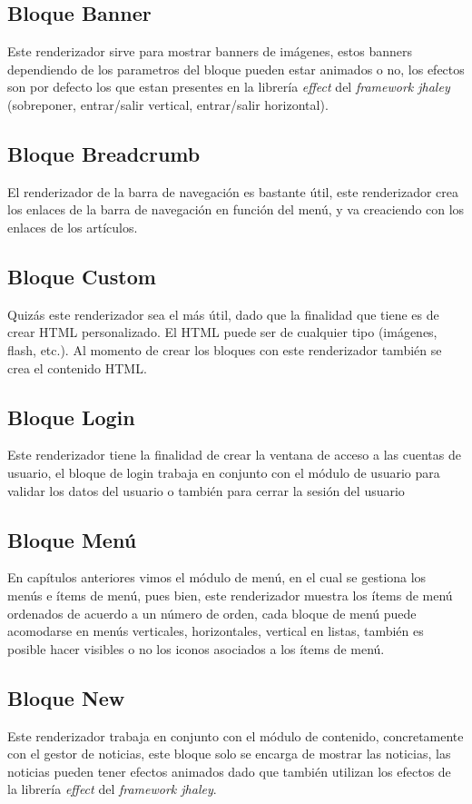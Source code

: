 \subsection{Bloque Banner}
Este renderizador sirve para mostrar banners de im\'agenes, estos banners dependiendo de los parametros del bloque pueden estar animados o no, los efectos son por defecto los que estan presentes en la librer\'ia \textit{effect} del \textit{framework jhaley} (sobreponer, entrar/salir vertical, entrar/salir horizontal).

\subsection{Bloque Breadcrumb}
El renderizador de la barra de navegaci\'on es bastante \'util, este renderizador crea los enlaces de la barra de navegaci\'on en funci\'on del men\'u, y va creaciendo con los enlaces de los art\'iculos.

\subsection{Bloque Custom}
Quiz\'as este renderizador sea el m\'as \'util, dado que la finalidad que tiene es de crear HTML personalizado. El HTML puede ser de cualquier tipo (im\'agenes, flash, etc.). Al momento de crear los bloques con este renderizador tambi\'en se crea el contenido HTML.

\subsection{Bloque Login}
Este renderizador tiene la finalidad de crear la ventana de acceso a las cuentas de usuario, el bloque de login trabaja en conjunto con el m\'odulo de usuario para validar los datos del usuario o tambi\'en para cerrar la sesi\'on del usuario

\subsection{Bloque Men\'u}
En cap\'itulos anteriores vimos el m\'odulo de men\'u, en el cual se gestiona los men\'us e \'items de men\'u, pues bien, este renderizador muestra los \'items de men\'u ordenados de acuerdo a un n\'umero de orden, cada bloque de men\'u puede acomodarse en men\'us verticales, horizontales, vertical en listas, tambi\'en es posible hacer visibles o no los iconos asociados a los \'items de men\'u.

\subsection{Bloque New}
Este renderizador trabaja en conjunto con el m\'odulo de contenido, concretamente con el gestor de noticias, este bloque solo se encarga de mostrar las noticias, las noticias pueden tener efectos animados dado que tambi\'en utilizan los efectos de la librer\'ia \textit{effect} del \textit{framework jhaley}.

